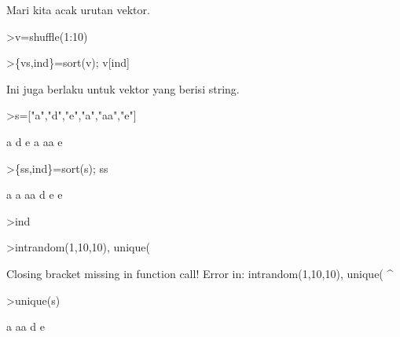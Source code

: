 \documentclass[a4paper,10pt]{article}
\begin{document}
\begin{eulernotebook}
\begin{eulercomment}
\begin{eulercomment}
\begin{eulercomment}
\begin{eulercomment}
\begin{eulercomment}
\begin{eulercomment}
\begin{eulercomment}
\begin{eulercomment}
\begin{eulercomment}
\begin{eulercomment}
\begin{eulercomment}
\begin{eulercomment}
\begin{eulercomment}
\begin{eulercomment}
\begin{eulercomment}
\begin{eulercomment}
\begin{eulercomment}
\begin{eulercomment}
\begin{eulercomment}
\begin{eulercomment}
\begin{eulercomment}
\begin{eulercomment}
\begin{eulercomment}
\begin{eulercomment}
\begin{eulercomment}
Mari kita acak urutan vektor.
\end{eulercomment}
\begin{eulerprompt}
>v=shuffle(1:10)
\end{eulerprompt}
\begin{euleroutput}
  [2,  5,  10,  9,  3,  4,  8,  1,  6,  7]
\end{euleroutput}
\begin{eulerprompt}
>\{vs,ind\}=sort(v); v[ind]
\end{eulerprompt}
\begin{euleroutput}
  [1,  2,  3,  4,  5,  6,  7,  8,  9,  10]
\end{euleroutput}
\begin{eulercomment}
Ini juga berlaku untuk vektor yang berisi string.
\end{eulercomment}
\begin{eulerprompt}
>s=["a","d","e","a","aa","e"]
\end{eulerprompt}
\begin{euleroutput}
  a
  d
  e
  a
  aa
  e
\end{euleroutput}
\begin{eulerprompt}
>\{ss,ind\}=sort(s); ss
\end{eulerprompt}
\begin{euleroutput}
  a
  a
  aa
  d
  e
  e
\end{euleroutput}
\begin{eulerprompt}
>ind
\end{eulerprompt}
\begin{euleroutput}
  [4,  1,  5,  2,  6,  3]
\end{euleroutput}
\begin{eulerprompt}
>intrandom(1,10,10), unique(%
\end{eulerprompt}
\begin{euleroutput}
  [9,  1,  7,  7,  8,  7,  9,  10,  6,  2]
  Closing bracket missing in function call!
  Error in:
  intrandom(1,10,10), unique(%
                              ^
\end{euleroutput}
\begin{eulerprompt}
>unique(s)
\end{eulerprompt}
\begin{euleroutput}
  a
  aa
  d
  e

\end{euleroutput}
\end{eulercomment}
\end{eulercomment}
\end{eulercomment}
\end{eulercomment}
\end{eulercomment}
\end{eulercomment}
\end{eulercomment}
\end{eulercomment}
\end{eulercomment}
\end{eulercomment}
\end{eulercomment}
\end{eulercomment}
\end{eulercomment}
\end{eulercomment}
\end{eulercomment}
\end{eulercomment}
\end{eulercomment}
\end{eulercomment}
\end{eulercomment}
\end{eulercomment}
\end{eulercomment}
\end{eulercomment}
\end{eulercomment}
\end{eulercomment}
\end{eulernotebook}
\end{document}
